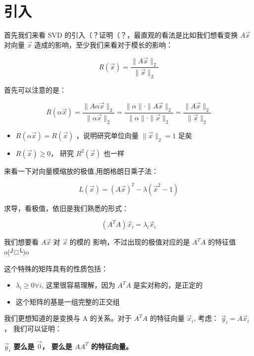 \documentclass[
]{book}
\providecommand{\tightlist}{%
  \setlength{\itemsep}{0pt}\setlength{\parskip}{0pt}}
\begin{document}
\hypertarget{ux5f15ux5165}{%
\section{引入}\label{ux5f15ux5165}}

首先我们来看 SVD 的引入（？证明（？，最直观的看法是比如我们想看变换 \(A\vec{x}\) 对向量 \(\vec{x}\) 造成的影响，至少我们来看对于模长的影响：

\[
R(\vec{x}) = \frac{\parallel A\vec{x}\parallel _2}{\parallel \vec{x}\parallel _2}
\]

首先可以注意的是：

\[
R(\alpha \vec{x}) = \frac{\parallel A \alpha \vec{x}\parallel _2}{\parallel \alpha \vec{x}\parallel _2} = \frac{\parallel \alpha\parallel  \cdot \parallel A  \vec{x}\parallel _2}{\parallel \alpha \parallel  \cdot \parallel \vec{x}\parallel _2} = \frac{\parallel A\vec{x}\parallel _2}{\parallel \vec{x}\parallel _2}
\]

\begin{itemize}
\tightlist
\item
  \(R(\alpha \vec{x}) = R(\vec{x})\) ，说明研究单位向量 \(\parallel \vec{x}\parallel _2 = 1\) 足矣
\item
  \(R(\vec{x}) \ge 0\)， 研究 \(R^2(\vec{x})\) 也一样
\end{itemize}

来看一下对向量模缩放的极值,用朗格朗日乘子法：

\[
L(\vec{x}) = (A\vec{x})^2 - \lambda(\vec{x}^2 - 1)
\]

求导，看极值，依旧是我们熟悉的形式：

\[
(A^TA)\vec{x}_i = \lambda_i\vec{x}_i \tag{1}
\]

我们想要看 \(A\vec{x}\) 对 \(\vec{x}\) 的模的 影响，不过出现的极值对应的是 \(A^TA\) 的特征值 o(╯□╰)o

这个特殊的矩阵具有的性质包括：

\begin{itemize}
\tightlist
\item
  \(\lambda_i \ge 0 \forall i\), 这里很容易理解，因为 \(A^TA\) 是实对称的，是正定的
\item
  这个矩阵的基是一组完整的正交组
\end{itemize}

我们更想知道的是变换与 A 的关系。对于 \(A^TA\) 的特征向量 \(\vec{x}_i\), 考虑： \(\vec{y}_i = A \vec{x}_i\)， 我们可以证明：

\textbf{\(\vec{y}_i\) 要么是 \(\vec{0}\)， 要么是 \(AA^T\) 的特征向量。}
\end{document}
